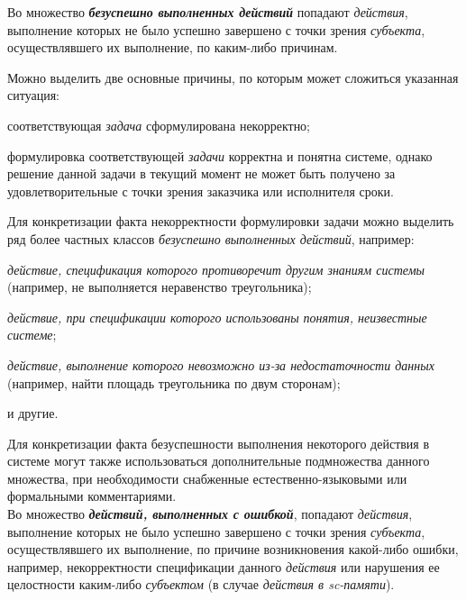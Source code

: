 \begin{frame}{}
\justifying
\vspace{10mm}
	
Во множество \textbf{\textit{безуспешно выполненных действий}} попадают \textit{действия}, выполнение которых не было успешно завершено с точки зрения \textit{субъекта}, осуществлявшего их выполнение, по каким-либо причинам.

\bigskip

Можно выделить две основные причины, по которым может сложиться указанная ситуация:
\begin{textitemize}
	\item соответствующая \textit{задача} сформулирована некорректно;
	\item формулировка соответствующей \textit{задачи} корректна и понятна системе, однако решение данной задачи в текущий момент не может быть получено за удовлетворительные с точки зрения заказчика или исполнителя сроки.
\end{textitemize}
\end{frame}

\begin{frame}{}
\justifying
\vspace{10mm}

Для конкретизации факта некорректности формулировки задачи можно выделить ряд более частных классов \textit{безуспешно выполненных действий}, например:
\begin{textitemize}
	\item \textit{действие, спецификация которого противоречит другим знаниям системы} (например, не выполняется неравенство треугольника);
	\item \textit{действие, при спецификации которого использованы понятия, неизвестные системе};
	\item \textit{действие, выполнение которого невозможно из-за недостаточности данных} (например, найти площадь треугольника по двум сторонам);
	\item и другие.
\end{textitemize}
\end{frame}

\begin{frame}{}
\justifying
\vspace{10mm}
	
Для конкретизации факта безуспешности выполнения некоторого действия в системе могут также использоваться дополнительные подмножества данного множества, при необходимости снабженные естественно-языковыми или формальными комментариями.\\

Во множество \textbf{\textit{действий, выполненных с ошибкой}}, попадают \textit{действия}, выполнение которых не было успешно завершено с точки зрения \textit{субъекта}, осуществлявшего их выполнение, по причине возникновения какой-либо ошибки, например, некорректности спецификации данного \textit{действия} или нарушения ее целостности каким-либо \textit{субъектом} (в случае \textit{действия в sc-памяти}).
\end{frame}

